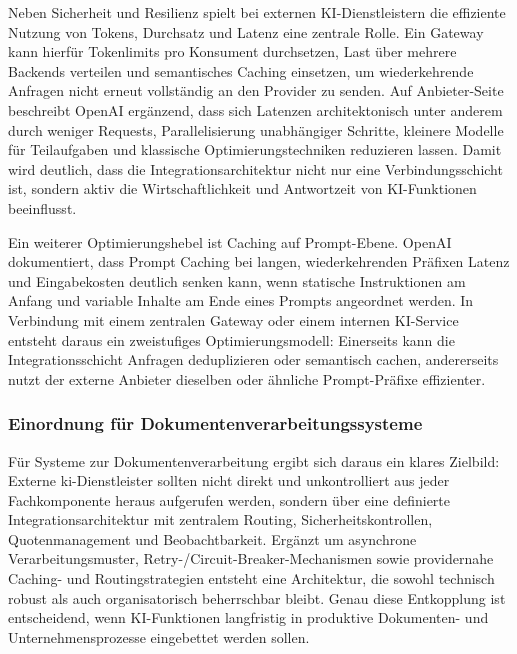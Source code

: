 Neben Sicherheit und Resilienz spielt bei externen KI-Dienstleistern die effiziente Nutzung von Tokens, Durchsatz und Latenz eine zentrale Rolle. Ein Gateway kann hierfür Tokenlimits pro Konsument durchsetzen, Last über mehrere Backends verteilen und semantisches Caching einsetzen, um wiederkehrende Anfragen nicht erneut vollständig an den Provider zu senden. Auf Anbieter-Seite beschreibt OpenAI ergänzend, dass sich Latenzen architektonisch unter anderem durch weniger Requests, Parallelisierung unabhängiger Schritte, kleinere Modelle für Teilaufgaben und klassische Optimierungstechniken reduzieren lassen. Damit wird deutlich, dass die Integrationsarchitektur nicht nur eine Verbindungsschicht ist, sondern aktiv die Wirtschaftlichkeit und Antwortzeit von KI-Funktionen beeinflusst. \cite{azure_ai_gateway_apim,openai_latency_optimization}

Ein weiterer Optimierungshebel ist Caching auf Prompt-Ebene. OpenAI dokumentiert, dass Prompt Caching bei langen, wiederkehrenden Präfixen Latenz und Eingabekosten deutlich senken kann, wenn statische Instruktionen am Anfang und variable Inhalte am Ende eines Prompts angeordnet werden. In Verbindung mit einem zentralen Gateway oder einem internen KI-Service entsteht daraus ein zweistufiges Optimierungsmodell: Einerseits kann die Integrationsschicht Anfragen deduplizieren oder semantisch cachen, andererseits nutzt der externe Anbieter dieselben oder ähnliche Prompt-Präfixe effizienter. \cite{openai_prompt_caching,azure_ai_gateway_apim}

\subsubsection{Einordnung für Dokumentenverarbeitungssysteme}

Für Systeme zur Dokumentenverarbeitung ergibt sich daraus ein klares Zielbild: Externe \gls{ki}-Dienstleister sollten nicht direkt und unkontrolliert aus jeder Fachkomponente heraus aufgerufen werden, sondern über eine definierte Integrationsarchitektur mit zentralem Routing, Sicherheitskontrollen, Quotenmanagement und Beobachtbarkeit. Ergänzt um asynchrone Verarbeitungsmuster, Retry-/Circuit-Breaker-Mechanismen sowie providernahe Caching- und Routingstrategien entsteht eine Architektur, die sowohl technisch robust als auch organisatorisch beherrschbar bleibt. Genau diese Entkopplung ist entscheidend, wenn KI-Funktionen langfristig in produktive Dokumenten- und Unternehmensprozesse eingebettet werden sollen. \cite{griesch2024ki,azure_ai_gateway_apim,azure_async_request_reply,azure_circuit_breaker}


